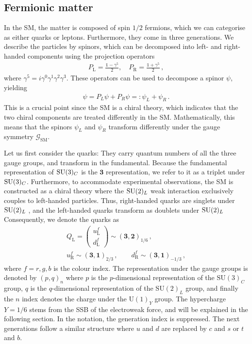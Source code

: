 \subsection{Fermionic matter}
In the SM, the matter is composed of spin $1/2$ fermions, which we can categorise as either quarks or leptons. Furthermore, they come in three generations. We describe the particles by spinors, which can be decomposed into left- and right-handed components using the projection operators
\begin{align}
    P_{\mathrm{L}} = \frac{\mathds{1} - \gamma^5}{2}, \quad P_{\mathrm{R}} = \frac{\mathds{1} + \gamma^5}{2}\,,
\end{align}
where $\gamma^5=i\gamma^0\gamma^1\gamma^2\gamma^3$. These operators can be used to decompose a spinor $\psi$, yielding 
\begin{align}
    \psi=P_L \psi+P_R\psi=:\psi_L+\psi_R\,.
\end{align}
This is a crucial point since the SM is a chiral theory, which indicates that the two chiral components are treated differently in the SM. Mathematically, this means that the spinors $\psi_L$ and $\psi_R$ transform differently under the gauge symmetry $\mathcal{G}_{\mathrm{SM}}$.

Let us first consider the quarks: They carry quantum numbers of all the three gauge groups, and transform in the fundamental. Because the fundamental representation of $\mathrm{SU}(3)_C$ is the $\mathbf{3}$ representation, we refer to it as a triplet under $\mathrm{SU}(3)_C$. Furthermore, to accommodate experimental observations, the SM is constructed as a chiral theory where the $\mathrm{SU}(2)_L$ weak interaction exclusively couples to left-handed particles. Thus, right-handed quarks are singlets under $\mathrm{SU}(2)_L$ , and the left-handed quarks transform as doublets under $\mathrm{SU}(2)_L$ Consequently, we denote the quarks as
\begin{align}
    Q_{\mathrm{L}} = \begin{pmatrix} u_{\mathrm{L}}^f  \\ d_{\mathrm{L}}^f \end{pmatrix} \sim (\mathbf{3}, \mathbf{2})_{1/6}\,,\\
    u_{\mathrm{R}}^f  \sim (\mathbf{3}, \mathbf{1})_{2/3}\,,\qquad d_{\mathrm{R}}^f \sim (\mathbf{3}, \mathbf{1})_{-1/3}\,,
\end{align}
where $f=r,g,b$ is the colour index. The representation under the gauge groups is denoted by $(p,q)_n$ where $p$ is the $p$-dimensional representation of the $\mathrm{SU}(3)_C$ group, $q$ is the $q$-dimensional representation of the $\mathrm{SU}(2)_L$ group, and finally the $n$ index denotes the charge under the $\mathrm{U}(1)_Y$ group. The hypercharge $Y=1/6$ stems from the SSB of the electroweak force, and will be explained in the following section. In the notation, the generation index is suppressed. The next generations follow a similar structure where $u$ and $d$ are replaced by $c$ and $s$ or $t$ and $b$. 

